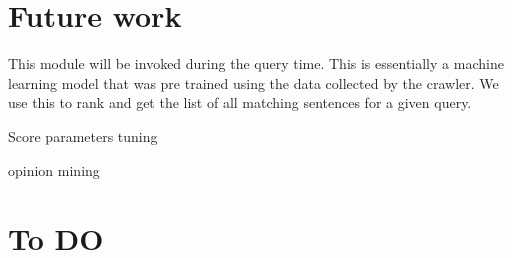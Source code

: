 \documentclass{article}
\begin{document}
\section{Future work}
\begin{description}
  \item[NLP module:] This module will be invoked during the query time.  This is essentially a machine learning model that was pre trained using the data collected by the crawler.  We use this to rank and get the list of all matching sentences for a given query.
 \item Score parameters tuning
 \item opinion mining
\end{description}

\section{To DO}
\end{document}
